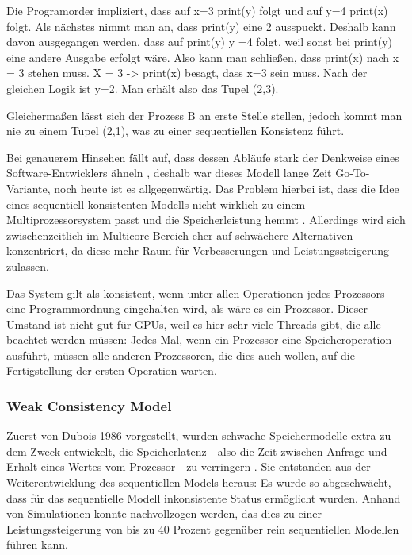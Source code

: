 \documentclass[final,bibliography=totocnumbered]{include/sikseminar}
\begin{document}
Die Programorder impliziert, dass auf x=3 print(y) folgt und auf y=4 print(x) folgt.
Als nächstes nimmt man an, dass print(y) eine 2 ausspuckt. Deshalb kann davon ausgegangen werden,
dass auf print(y) y =4 folgt, weil sonst bei print(y) eine andere Ausgabe erfolgt wäre. Also kann man schließen, dass print(x) nach x = 3 stehen muss.
X = 3 -> print(x) besagt, dass x=3 sein muss. Nach der gleichen Logik ist y=2. Man erhält also das Tupel (2,3). 

Gleichermaßen lässt sich der Prozess B an erste Stelle stellen, jedoch kommt man nie zu einem Tupel (2,1), was zu einer sequentiellen Konsistenz führt.

Bei genauerem Hinsehen fällt auf, dass dessen Abläufe stark der Denkweise eines Software-Entwicklers ähneln \cite{eesmog}
, deshalb
war dieses Modell lange Zeit Go-To-Variante, noch heute ist es allgegenwärtig. Das Problem hierbei ist, dass die Idee eines sequentiell konsistenten Modells nicht wirklich zu einem Multiprozessorsystem passt und die Speicherleistung hemmt \cite{msssm}.
  Allerdings wird sich zwischenzeitlich im Multicore-Bereich eher auf schwächere Alternativen konzentriert, da diese mehr Raum für Verbesserungen und Leistungssteigerung zulassen.



Das System gilt als konsistent, wenn unter allen Operationen jedes Prozessors eine Programmordnung eingehalten wird, als wäre es ein Prozessor.
Dieser Umstand ist nicht gut für GPUs, weil es hier sehr viele Threads gibt, die alle beachtet werden müssen: Jedes Mal, wenn ein Prozessor eine Speicheroperation ausführt, müssen alle anderen Prozessoren, die dies auch wollen, auf die Fertigstellung der ersten Operation warten.


	\bigskip



	\subsubsection{Weak Consistency Model}


Zuerst von Dubois 1986 vorgestellt,
wurden schwache Speichermodelle extra zu dem Zweck entwickelt, die Speicherlatenz - also die Zeit zwischen Anfrage und Erhalt eines Wertes vom Prozessor - zu verringern \cite{mcm3}.
Sie entstanden aus der Weiterentwicklung des sequentiellen Models heraus: Es wurde so abgeschwächt, dass für das sequentielle Modell inkonsistente Status ermöglicht wurden.
Anhand von Simulationen konnte nachvollzogen werden, das dies zu einer Leistungssteigerung von bis zu 40 Prozent gegenüber rein sequentiellen Modellen führen kann\cite{mcm5}.
\end{document}
